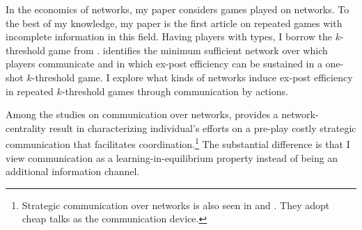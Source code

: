 \documentclass[12pt,letter]{article}
\theoremstyle{definition}
\theoremstyle{remark}
\theoremstyle{claim}
\begin{document}
In the economics of networks, my paper considers games played on networks. To the best of my knowledge, my paper is the first article on repeated games with incomplete information in this field. Having players with types, I borrow the $k$-threshold game from \citep{Chwe2000}. \citep{Chwe2000} identifies the minimum sufficient network over which players communicate and in which ex-post efficiency can be sustained in a one-shot $k$-threshold game. I explore what kinds of networks induce ex-post efficiency in repeated $k$-threshold games through communication by actions. 

Among the studies on communication over networks, \citep{Calvo2015} provides a network-centrality result in characterizing individual's efforts on a pre-play costly strategic communication that facilitates coordination.\footnote{Strategic communication over networks is also seen in \citep{Hagenbach2010} and \citep{Galeotti2010}. They adopt cheap talks as the communication device.} 
The substantial difference is that I view communication as a learning-in-equilibrium property instead of being an additional information channel.
\end{document}

